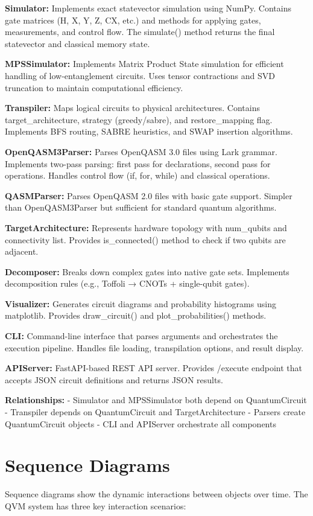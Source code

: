 \textbf{Simulator:} Implements exact statevector simulation using NumPy. Contains gate matrices (H, X, Y, Z, CX, etc.) and methods for applying gates, measurements, and control flow. The simulate() method returns the final statevector and classical memory state.

\textbf{MPSSimulator:} Implements Matrix Product State simulation for efficient handling of low-entanglement circuits. Uses tensor contractions and SVD truncation to maintain computational efficiency.

\textbf{Transpiler:} Maps logical circuits to physical architectures. Contains target\_architecture, strategy (greedy/sabre), and restore\_mapping flag. Implements BFS routing, SABRE heuristics, and SWAP insertion algorithms.

\textbf{OpenQASM3Parser:} Parses OpenQASM 3.0 files using Lark grammar. Implements two-pass parsing: first pass for declarations, second pass for operations. Handles control flow (if, for, while) and classical operations.

\textbf{QASMParser:} Parses OpenQASM 2.0 files with basic gate support. Simpler than OpenQASM3Parser but sufficient for standard quantum algorithms.

\textbf{TargetArchitecture:} Represents hardware topology with num\_qubits and connectivity list. Provides is\_connected() method to check if two qubits are adjacent.

\textbf{Decomposer:} Breaks down complex gates into native gate sets. Implements decomposition rules (e.g., Toffoli → CNOTs + single-qubit gates).

\textbf{Visualizer:} Generates circuit diagrams and probability histograms using matplotlib. Provides draw\_circuit() and plot\_probabilities() methods.

\textbf{CLI:} Command-line interface that parses arguments and orchestrates the execution pipeline. Handles file loading, transpilation options, and result display.

\textbf{APIServer:} FastAPI-based REST API server. Provides /execute endpoint that accepts JSON circuit definitions and returns JSON results.

\textbf{Relationships:}
- Simulator and MPSSimulator both depend on QuantumCircuit
- Transpiler depends on QuantumCircuit and TargetArchitecture
- Parsers create QuantumCircuit objects
- CLI and APIServer orchestrate all components

\section{Sequence Diagrams}
Sequence diagrams show the dynamic interactions between objects over time. The QVM system has three key interaction scenarios:

